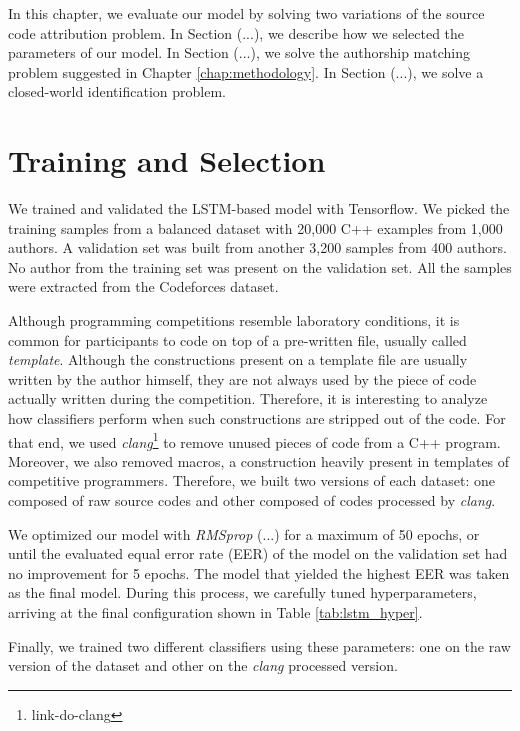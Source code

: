 \label{chap:evaluation}

In this chapter, we evaluate our model by solving two variations of the source code attribution problem. In Section (...), we describe how we selected the parameters of our model. In Section (...), we solve the authorship matching problem suggested in Chapter \ref{chap:methodology}. In Section (...), we solve a closed-world identification problem.

\section{Training and Selection}\label{sec:validation}

We trained and validated the LSTM-based model with Tensorflow. We picked the training samples from a balanced dataset with 20,000 C++ examples from 1,000 authors. A validation set was built from another 3,200 samples from 400 authors. No author from the training set was present on the validation set. All the samples were extracted from the Codeforces dataset.

Although programming competitions resemble laboratory conditions, it is common for participants to code on top of a pre-written file, usually called \textit{template}. Although the constructions present on a template file are usually written by the author himself, they are not always used by the piece of code actually written during the competition. Therefore, it is interesting to analyze how classifiers perform when such constructions are stripped out of the code. For that end, we used \textit{clang}\footnote{link-do-clang} to remove unused pieces of code from a C++ program. Moreover, we also removed macros, a construction heavily present in templates of competitive programmers. Therefore, we built two versions of each dataset: one composed of raw source codes and other composed of codes processed by \textit{clang}.

We optimized our model with \textit{RMSprop} (...) for a maximum of 50 epochs, or until the evaluated equal error rate (EER) of the model on the validation set had no improvement for 5 epochs. The model that yielded the highest EER was taken as the final model. During this process, we carefully tuned hyperparameters, arriving at the final configuration shown in Table \ref{tab:lstm_hyper}.

Finally, we trained two different classifiers using these parameters: one on the raw version of the dataset and other on the \textit{clang} processed version.

